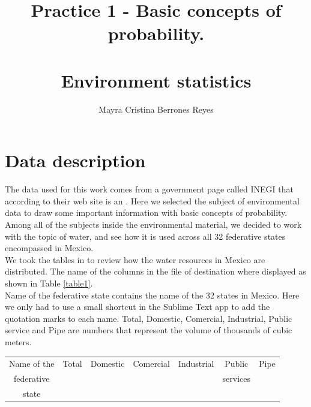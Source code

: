 \documentclass{article}
\begin{document}
\title{%
  Practice 1 - Basic concepts of probability. \\~\\
  \Large Environment statistics}
\author{Mayra Cristina Berrones Reyes}

\maketitle


\section{Data description}
The data used for this work comes from a government page called INEGI \cite{ine1} that according to their web site is an  \cite{ine1}. Here we selected the subject of environmental data to draw some important information with basic concepts of probability.\\

Among all of the subjects inside the environmental material, we decided to work with the topic of water\cite{ine3}, and see how it is used across all 32 federative states encompassed in Mexico.\\

We took the tables in \cite{ine3} to review how the water resources in Mexico are distributed. The name of the columns in the file of destination where displayed as shown in Table \ref{table1}.\\

Name of the federative state contains the name of the 32 states in Mexico. Here we only had to use a small shortcut in the Sublime Text app to add the quotation marks to each name. Total, Domestic, Comercial, Industrial, Public service and Pipe are numbers that represent the volume of thousands of cubic meters. \\

\begin{center}\label{table1}
\begin{tabular}{| c | c | c | c | c | c | c |}

\hline
Name of the  & Total & Domestic & Comercial & Industrial & Public & Pipe\\  
federative  &  	&  		&			&		& services&\\  
 state  &  	&  		&			&		& &\\  
 \hline
\end{tabular}
\end{center}
\end{document}
